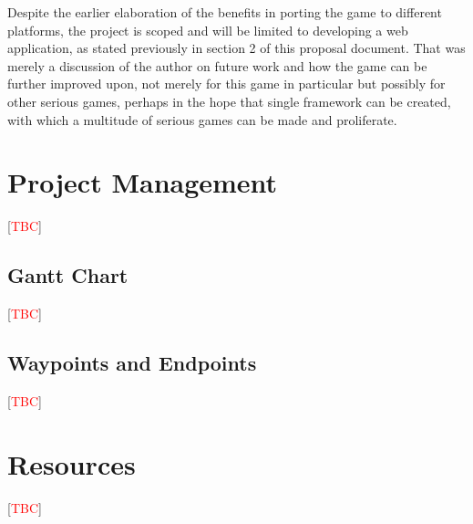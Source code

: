 \documentclass[a4paper]{article}
\newcommand{\comment}[1]{[\textcolor{red}{#1}]} %
\begin{document}
Despite the earlier elaboration of the benefits in porting the game to different platforms, the project is scoped and will be limited to developing a web application, as stated previously in section 2 of this proposal document. That was merely a discussion of the author on future work and how the game can be further improved upon, not merely for this game in particular but possibly for other serious games, perhaps in the hope that single framework can be created, with which a multitude of serious games can be made and proliferate.

\section{Project Management}
\comment{TBC}
\subsection{Gantt Chart}
\comment{TBC}
\subsection{Waypoints and Endpoints}
\comment{TBC}

\section{Resources}
\comment{TBC}

\newpage
\printbibliography
\end{document}
